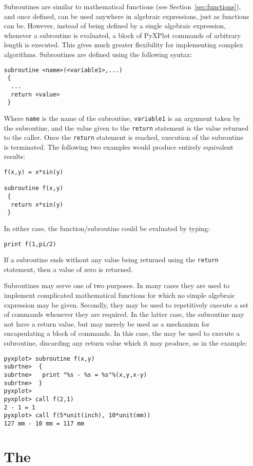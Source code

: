 Subroutines are similar to mathematical functions (see
Section~\ref{sec:functions}), and once defined, can be used anywhere in
algebraic expressions, just as functions can be.  However, instead of being
defined by a single algebraic expression, whenever a subroutine is evaluated, a
block of PyXPlot commands of arbitrary length is executed. This gives much
greater flexibility for implementing complex algorithms. Subroutines are
defined using the following syntax:
\begin{verbatim}
subroutine <name>(<variable1>,...)
 {
  ...
  return <value>
 }
\end{verbatim}
Where {\tt name} is the name of the subroutine, {\tt variable1} is an argument
taken by the subroutine, and the value given to the {\tt return} statement is
the value returned to the caller. Once the {\tt return} statement is reached,
execution of the subroutine is terminated. The following two examples would
produce entirely equivalent results:
\begin{verbatim}
f(x,y) = x*sin(y)

subroutine f(x,y)
 {
  return x*sin(y)
 }
\end{verbatim}
In either case, the function/subroutine could be evaluated by typing:
\begin{verbatim}
print f(1,pi/2)
\end{verbatim}
If a subroutine ends without any value being returned using the {\tt return}
statement, then a value of zero is returned.

Subroutines may serve one of two purposes. In many cases they are used to
implement complicated mathematical functions for which no simple algebraic
expression may be given. Secondly, they may be used to repetitively execute a
set of commands whenever they are required. In the latter case, the subroutine
may not have a return value, but may merely be used as a mechanism for
encapsulating a block of commands.  In this case, the  may be
used to execute a subroutine, discarding any return value which it may produce,
as in the example:
\begin{verbatim}
pyxplot> subroutine f(x,y)
subrtne>  {
subrtne>   print "%s - %s = %s"%(x,y,x-y)
subrtne>  }
pyxplot> 
pyxplot> call f(2,1)
2 - 1 = 1
pyxplot> call f(5*unit(inch), 10*unit(mm))
127 mm - 10 mm = 117 mm
\end{verbatim}

\section{The }

